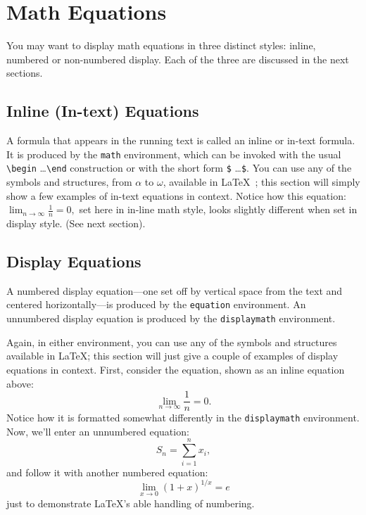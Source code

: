 \documentclass[
]{ceurart}
\begin{document}
\section{Math Equations}

You may want to display math equations in three distinct styles: inline, numbered or non-numbered display.  Each of the three are discussed in the next sections.

\subsection{Inline (In-text) Equations}

A formula that appears in the running text is called an inline or
in-text formula.  It is produced by the \verb|math| environment,
which can be invoked with the usual
\verb|\begin| \ldots \verb|\end| construction or with
the short form \verb|$| \ldots \verb|$|. You can use any of the symbols
and structures, from $\alpha$ to $\omega$, available in
\LaTeX~\cite{Lamport:LaTeX};
this section will simply show a few
examples of in-text equations in context. Notice how this equation:
\begin{math}
  \lim_{n\rightarrow \infty} \frac{1}{n} = 0,
\end{math}
set here in in-line math style, looks slightly different when
set in display style.  (See next section).

\subsection{Display Equations}

A numbered display equation---one set off by vertical space from the
text and centered horizontally---is produced by the \verb|equation|
environment. An unnumbered display equation is produced by the
\verb|displaymath| environment.

Again, in either environment, you can use any of the symbols and
structures available in \LaTeX{}; this section will just give a couple
of examples of display equations in context.  First, consider the
equation, shown as an inline equation above:
\begin{equation}
  \lim_{n\rightarrow \infty} \frac{1}{n} = 0.
\end{equation}
Notice how it is formatted somewhat differently in
the \verb|displaymath|
environment.  Now, we'll enter an unnumbered equation:
\begin{displaymath}
  S_{n} = \sum_{i=1}^{n} x_{i} ,
\end{displaymath}
and follow it with another numbered equation:
\begin{equation}
  \lim_{x \to 0} (1 + x)^{1/x} = e
\end{equation}
just to demonstrate \LaTeX's able handling of numbering.
\end{document}
